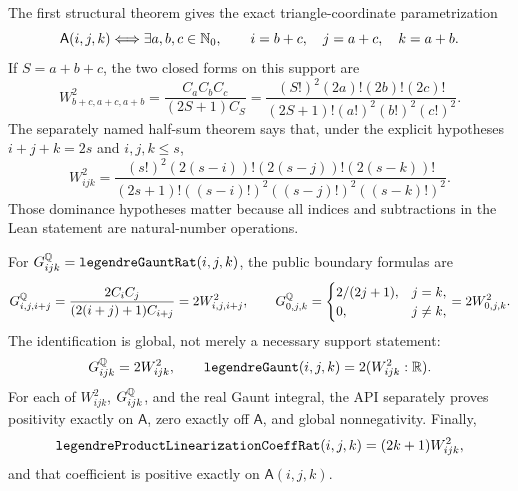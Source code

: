 \documentclass[11pt,oneside]{article}
\theoremstyle{definition}
\theoremstyle{remark}
\begin{document}
The first structural theorem gives the exact triangle-coordinate parametrization
\[
 \mathsf A(i,j,k)\Longleftrightarrow
 \exists a,b,c\in\mathbb{N}_{0},\qquad
 i=b+c,\quad j=a+c,\quad k=a+b.
\]
If \(S=a+b+c\), the two closed forms on this support are
\[
 W^2_{b+c,a+c,a+b}
 =\frac{C_aC_bC_c}{(2S+1)C_S}
 =\frac{(S!)^2(2a)!(2b)!(2c)!}
 {(2S+1)!(a!)^2(b!)^2(c!)^2}.
\]
The separately named half-sum theorem says that, under the explicit hypotheses
\(i+j+k=2s\) and \(i,j,k\le s\),
\[
 W^2_{ijk}
 =\frac{(s!)^2(2(s-i))!(2(s-j))!(2(s-k))!}
 {(2s+1)!((s-i)!)^2((s-j)!)^2((s-k)!)^2}.
\]
Those dominance hypotheses matter because all indices and subtractions in the Lean
statement are natural-number operations.

For \(G^{\mathbb{Q}}_{ijk}=\text{\ttfamily legendreGauntRat}(i,j,k)\), the public
boundary formulas are
\[
 G^{\mathbb{Q}}_{i,j,i+j}
 =\frac{2C_iC_j}{(2(i+j)+1)C_{i+j}}
 =2W^2_{i,j,i+j},
\qquad
 G^{\mathbb{Q}}_{0,j,k}
 =\begin{cases}2/(2j+1),&j=k,\\0,&j\ne k,\end{cases}
 =2W^2_{0,j,k}.
\]
The identification is global, not merely a necessary support statement:
\[
 G^{\mathbb{Q}}_{ijk}=2W^2_{ijk},\qquad
 \text{\ttfamily legendreGaunt}(i,j,k)=2(W^2_{ijk}:\mathbb{R}).
\]
For each of \(W^2_{ijk}\), \(G^{\mathbb{Q}}_{ijk}\), and the real Gaunt integral,
the API separately proves positivity exactly on \(\mathsf A\), zero exactly off
\(\mathsf A\), and global nonnegativity.  Finally,
\[
 \text{\ttfamily legendreProductLinearizationCoeffRat}(i,j,k)
 =(2k+1)W^2_{ijk},
\]
and that coefficient is positive exactly on \(\mathsf A(i,j,k)\).
\end{document}
